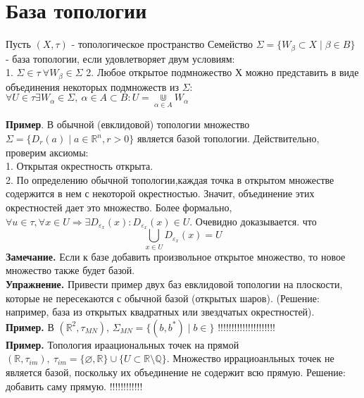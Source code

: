 \section{База топологии}
\begin{defin}
    Пусть $(X,\tau)$ - топологическое пространство
    Семейство  $\Sigma=\{W_\beta\subset X\mid \beta\in B \} $ - база топологии,
    если удовлетворяет двум условиям:\\
    1. $\Sigma\in\tau~\forall W_\beta\in\Sigma$
    2. Любое открытое подмножество Х можно представить в виде
    объединения некоторых подмножеств из $\Sigma$: 
    $\forall U\in\tau\exists W_\alpha\in\Sigma,~\alpha\in A\subset B:
    U=\Cup\limits_{\alpha\in A}W_\alpha $
\end{defin}
\textbf{Пример}. В обычной (евклидовой) топологии множество 
$\Sigma=\{D_r(a)\mid a\in\mathbb{R}^n,r>0\}$ является базой топологии.
Действительно, проверим аксиомы:\\
1. Открытая окрестность открыта.\\
2. По определению обычной топологии,каждая точка в открытом множестве
содержится в нем с некоторой окрестностью. Значит, объединение этих
окрестностей дает это множество. Более формально,
$\forall u\in\tau,\forall x\in U\Rightarrow \exists D_{\varepsilon_x}(x):
D_{\varepsilon_x}(x)\in U$. Очевидно доказывается. что 
$$\boxed{\bigcup_{x\in U}D_{\varepsilon_x}(x)=U}$$ 
\textbf{Замечание.} Если к базе добавить произвольное открытое множество, то
новое множество также будет базой.\\
\textbf{Упражнение.} Привести пример двух баз евклидовой топологии на 
плоскости, которые не пересекаются с обычной базой (открытых шаров). 
(Решение: например, база из открытых квадратных или звездчатых окрестностей).\\
\textbf{Пример.} В $(\mathbb{R}^2,\tau_{MN})$, 
$\Sigma_{MN}=\{(b,b^*)\mid b\in\} $ !!!!!!!!!!!!!!!!!!!!!\\
\textbf{Пример.} Топология ираациональных точек на прямой
$(\mathbb{R},\tau_{im}),~\tau_{im}=\{\varnothing,\mathbb{R}\}\cup
\{U\subset \mathbb{R}\setminus\mathbb{Q}\} $.
Множество иррациоанльных точек не является базой, поскольку их объединение не
содержит всю прямую. Решение: добавить саму прямую. !!!!!!!!!!!!\\

